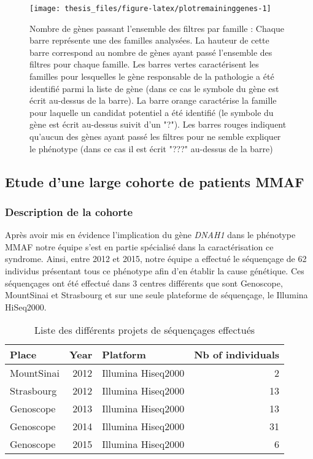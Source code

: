 \documentclass[12pt,twoside]{reedthesis}
\theoremstyle{definition}
\theoremstyle{definition}
\theoremstyle{remark}
\begin{document}
  \begin{figure}
  
  {\centering \texttt{[image: thesis\_files/figure-latex/plotremaininggenes-1]} 
  
  }
  
  \caption[Nombre de gènes passant l'ensemble des filtres par famille]{Nombre de gènes passant l'ensemble des filtres par famille  :  Chaque barre représente une des familles analysées. La hauteur de cette barre correspond au nombre de gènes ayant passé l'ensemble des filtres pour chaque famille. Les barres vertes caractérisent les familles pour lesquelles le gène responsable de la pathologie a été identifié parmi la liste de gène (dans ce cas le symbole du gène est écrit au-dessus de la barre). La barre orange caractérise la famille pour laquelle un candidat potentiel a été identifié (le symbole du gène est écrit au-dessus suivit d'un "?"). Les barres rouges indiquent qu'aucun des gènes ayant passé les filtres pour ne semble expliquer le phénotype (dans ce cas il est écrit "???" au-dessus de la barre)}\label{fig:plotremaininggenes}
  \end{figure}
  
  \newpage
  
  \subsection{Etude d'une large cohorte de patients
  MMAF}\label{cohortemmah}
  
  \subsubsection{Description de la
  cohorte}\label{description-de-la-cohorte}
  
  Après avoir mis en évidence l'implication du gène \emph{DNAH1} dans le
  phénotype MMAF notre équipe s'est en partie spécialisé dans la
  caractérisation ce syndrome. Ainsi, entre 2012 et 2015, notre équipe a
  effectué le séquençage de 62 individus présentant tous ce phénotype afin
  d'en établir la cause génétique. Ces séquençages ont été effectué dans 3
  centres différents que sont Genoscope, MountSinai et Strasbourg et sur
  une seule plateforme de séquençage, le Illumina HiSeq2000.
  
  \begin{longtable}[t]{lrlr}
  \caption{\label{tab:tabcohort}Liste des différents projets de séquençages effectués}\\
  \toprule
  Place & Year & Platform & Nb of individuals\\
  \midrule
  MountSinai & 2012 & Illumina Hiseq2000 & 2\\
  Strasbourg & 2012 & Illumina Hiseq2000 & 13\\
  Genoscope & 2013 & Illumina Hiseq2000 & 13\\
  Genoscope & 2014 & Illumina Hiseq2000 & 31\\
  Genoscope & 2015 & Illumina Hiseq2000 & 6\\
  \bottomrule
  \end{longtable}
  
\end{document}

